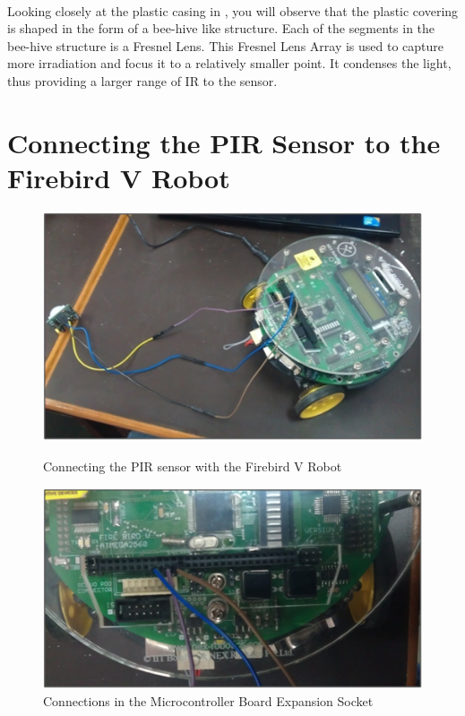 \documentclass[a4paper,12 pt]{article}
\begin{document}
\\
Looking closely at the plastic casing in , you will observe that the plastic covering is shaped in the form of a bee-hive like structure. Each of the segments in the bee-hive structure is a Fresnel Lens. This Fresnel Lens Array is used to capture more irradiation and focus it to a relatively smaller point. It condenses the light, thus providing a larger range of IR to the sensor.

\pagebreak
\section{Connecting the PIR Sensor to the Firebird V Robot}



\begin{figure}[h]
\begin{center}
\includegraphics[scale=0.8]{con1.png}
\caption{Connecting the PIR sensor with the Firebird V Robot}
\label{fig:9}

\includegraphics[scale=0.8]{con2.png}
\caption{Connections in the Microcontroller Board Expansion Socket}
\label{fig:10}
\end{center}
\end{figure}
\end{document}
